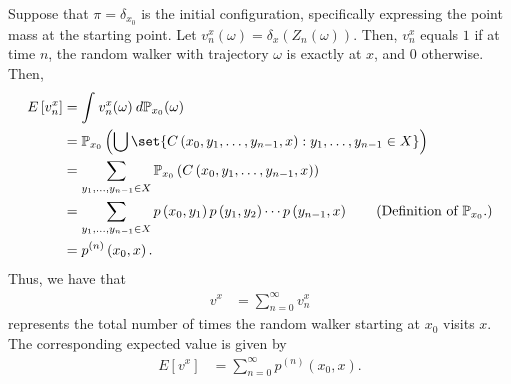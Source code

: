 \documentclass[10pt]{mypackage}
\begin{document}
Suppose that $\pi = \delta_{x_0}$ is the initial configuration, specifically expressing the point mass at the starting point. Let $v_n^x(\omega) = \delta_x\left( Z_n(\omega) \right)$. Then, $v_n^x$ equals $1$ if at time $n$, the random walker with trajectory $\omega$ is exactly at $x$, and $0$ otherwise. Then,
\begin{align*}
  E\left[ v_n^x \right] &= \int_{}^{} v_n^x(\omega)\:d \mathbb{P}_{x_0}(\omega)\\
                        &= \mathbb{P}_{x_0}\left( \bigcup\set{C\left( x_0,y_1,\dots,y_{n-1},x \right) : y_1,\dots,y_{n-1}\in X} \right)\\
                        &= \sum_{y_1,\dots,y_{n-1}\in X} \mathbb{P}_{x_0}\left( C\left( x_0,y_1,\dots,y_{n-1},x \right) \right)\\
                        &= \sum_{y_1,\dots,y_{n-1}\in X}p\left( x_0,y_1 \right)p\left( y_1,y_2 \right)\cdots p\left( y_{n-1},x \right)\tag{Definition of $ \mathbb{P}_{x_0} $.}\\
                        &= p^{(n)}\left( x_0,x \right).
\end{align*}
Thus, we have that
\begin{align*}
  v^x &= \sum_{n=0}^{\infty}v_n^x
\end{align*}
represents the total number of times the random walker starting at $x_0$ visits $x$. The corresponding expected value is given by
\begin{align*}
  E\left[ v^x \right] &= \sum_{n=0}^{\infty}p^{(n)}\left( x_0,x \right).
\end{align*}
\end{document}
